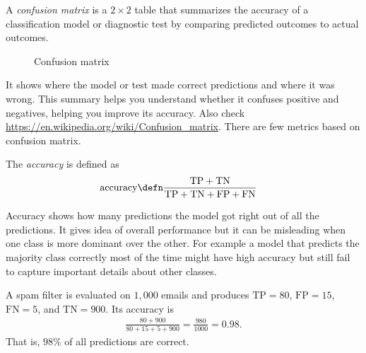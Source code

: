 \documentclass[a4paper, 12pt]{book}
\begin{document}
\begin{definition}
    A \emph{confusion matrix} is a $2 \times 2$ table that summarizes the accuracy of a classification model or diagnostic test by comparing predicted outcomes to actual outcomes. 
\begin{figure}[H]
\begin{center}
\end{center}
    \caption{Confusion matrix}
\end{figure}
\end{definition}
It shows where the model or test made correct predictions and where it was wrong. This summary helps you understand whether it confuses positive and negatives, helping you improve its accuracy. Also check \url{https://en.wikipedia.org/wiki/Confusion_matrix}. There are few metrics based on confusion matrix.

\begin{definition}
    The \emph{accuracy} is defined as 
    \begin{align}
        \text{accuracy} &\defn \frac{\mathrm{TP} + \mathrm{TN}}{\mathrm{TP} + \mathrm{TN} + \mathrm{FP} + \mathrm{FN}}
    \end{align}
\end{definition}
Accuracy shows how many predictions the model got right out of all the predictions. It gives idea of overall performance but it can be misleading when one class is more dominant over the other. For example a model that predicts the majority class correctly most of the time might have high accuracy but still fail to capture important details about other classes. 
\begin{example}
    A spam filter is evaluated on $1{,}000$ emails and produces
    $\mathrm{TP}=80$, $\mathrm{FP}=15$, $\mathrm{FN}=5$, and $\mathrm{TN}=900$.
    Its accuracy is
    \begin{align}
        \frac{80+900}{80+15+5+900} = \frac{980}{1000} = 0.98.
    \end{align}
    That is, $98\%$ of all predictions are correct.
\end{example}
\end{document}
